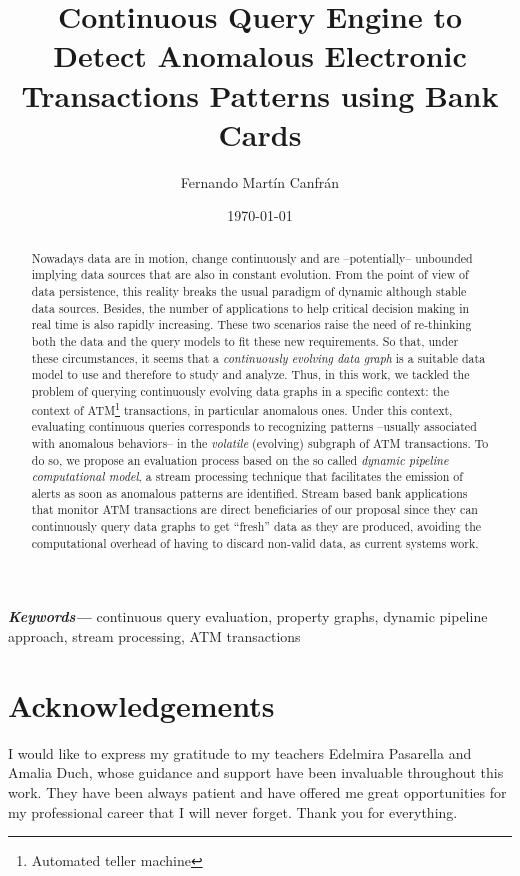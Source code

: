 \documentclass[12pt,a4paper]{article}
\title{Continuous Query Engine to Detect Anomalous Electronic Transactions Patterns using Bank Cards}
\author{Fernando Martín Canfrán}
\date{\today}
\providecommand{\keywords}[1]
{
  \small	
  \textbf{\textit{Keywords---}} #1
}
\begin{document}



\begin{abstract}
Nowadays data are in motion, change continuously and are –potentially–
unbounded implying data sources that are also in constant evolution. From the  point of view of
data persistence, this reality breaks the usual paradigm of  dynamic although stable data sources. 
Besides, the number of applications to help critical decision making in real time is also rapidly increasing. 
These two scenarios raise the need of re-thinking both the data and the query models to fit these new requirements. 
So that, under these circumstances, it seems that a {\em continuously  evolving data graph} is a suitable data model to use and therefore to study and analyze.
Thus, in this work, we tackled the problem of querying continuously evolving data graphs in a specific context: 
the context of ATM\footnote{Automated teller machine} transactions, in particular anomalous ones. 
Under this context, evaluating continuous queries corresponds to recognizing patterns --usually associated with anomalous behaviors-- 
in the {\em volatile} (evolving) subgraph of ATM transactions. 
To do so, we propose an evaluation process based on the so called {\em dynamic pipeline
computational model}, a stream processing technique that facilitates  the emission of alerts as soon as anomalous patterns are identified. 
Stream based bank applications that monitor ATM transactions are direct beneficiaries of our proposal since they can continuously query data graphs 
to get “fresh” data as they are produced, avoiding the computational overhead of having to discard non-valid data, as current systems work.
\end{abstract} 

\keywords{continuous query evaluation, property graphs, dynamic pipeline approach, stream processing, ATM transactions}

\newpage

\section*{Acknowledgements}

I would like to express my gratitude to my teachers Edelmira Pasarella and Amalia Duch, whose guidance and support have been invaluable throughout this work. They have been always patient and have offered me great opportunities for my professional career that I will never forget. Thank you for everything.\\
\end{document}
